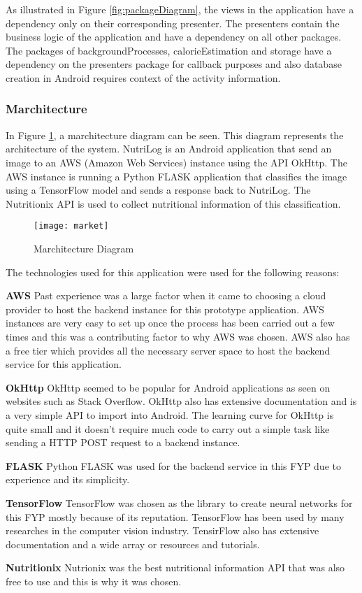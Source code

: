 As illustrated in Figure \ref{fig:packageDiagram}, the views in the application
have a dependency only on their corresponding presenter.
The presenters contain the business logic of the  application and have a dependency on all other packages.
The packages of backgroundProcesses, calorieEstimation and storage have a dependency on the presenters package for callback purposes and also database creation in Android requires context of the activity information.

\tocless\subsubsection{Marchitecture}
In Figure \ref{fig:market}, a marchitecture diagram can be seen.
This diagram represents the architecture of the system.
NutriLog is an Android application that send an image to an AWS (Amazon Web Services) instance using the API OkHttp. The AWS instance is running a Python FLASK application that classifies the image using a TensorFlow model and sends a response back to NutriLog. The Nutritionix API is used to collect nutritional information of this classification.

\begin{figure}[h]
    \centering
    \texttt{[image: market]}
    \caption{Marchitecture Diagram}
    \label{fig:market}
\end{figure}

The technologies used for this application were used for the following reasons:

\textbf{AWS}
\linebreak
Past experience was a large factor when it came to choosing a cloud provider to host the backend instance for this prototype application.
AWS instances are very easy to set up once the process has been carried out a few times and this was a contributing factor to why AWS was chosen.
AWS also has a free tier which provides all the necessary server space to host the backend service for this application.

\textbf{OkHttp}
\linebreak
OkHttp seemed to be popular for Android applications as seen on websites such as Stack Overflow.
OkHttp also has extensive documentation and is a very simple API to import into Android.
The learning curve for OkHttp is quite small and it doesn't require much code to carry out a simple task like sending a HTTP POST request to a backend instance.

\textbf{FLASK}
\linebreak
Python FLASK was used for the backend service in this FYP due to experience and its simplicity.

\textbf{TensorFlow}
\linebreak
TensorFlow was chosen as the library to create neural networks for this FYP mostly because of its reputation.
TensorFlow has been used by many researches in the computer vision industry.
TensirFlow also has extensive documentation and a wide array or resources and tutorials.

\textbf{Nutritionix}
\linebreak
Nutrionix was the best nutritional information API that was also free to use and this is why it was chosen.